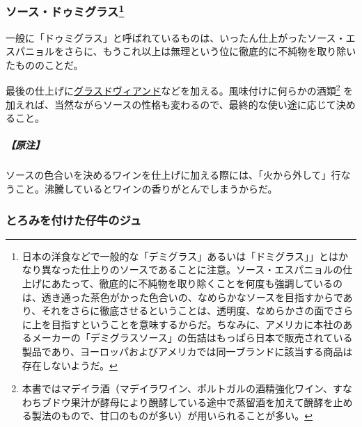 \begin{recette}
\hypertarget{sauce-demi-glace}{%
\subsubsection[ソース・ドゥミグラス]{\texorpdfstring{ソース・ドゥミグラス\footnote{日本の洋食などで一般的な「デミグラス」あるいは「ドミグラス」」とはかなり異なった仕上りのソースであることに注意。ソース・エスパニョルの仕上げにあたって、徹底的に不純物を取り除くことを何度も強調しているのは、透き通った茶色がかった色合いの、なめらかなソースを目指すからであり、それをさらに徹底させるということは、透明度、なめらかさの面でさらに上を目指すということを意味するからだ。ちなみに、アメリカに本社のあるメーカーの「デミグラスソース」の缶詰はもっぱら日本で販売されている製品であり、ヨーロッパおよびアメリカでは同一ブランドに該当する商品は存在しないようだ。}}{ソース・ドゥミグラス}}\label{sauce-demi-glace}}



一般に「ドゥミグラス」と呼ばれているものは、いったん仕上がったソース・エスパニョルをさらに、もうこれ以上は無理という位に徹底的に不純物を取り除いたもののことだ。

最後の仕上げに\protect\hyperlink{glace-de-viande}{グラスドヴィアンド}などを加える。風味付けに何らかの酒類\footnote{本書ではマデイラ酒（マデイラワイン、ポルトガルの酒精強化ワイン、すなわちブドウ果汁が酵母により醗酵している途中で蒸留酒を加えて醗酵を止める製法のもので、甘口のものが多い）が用いられることが多い。}
を加えれば、当然ながらソースの性格も変わるので、最終的な使い途に応じて決めること。

\hypertarget{nota-sauce-demi-glace}{%
\subparagraph{【原注】}\label{nota-sauce-demi-glace}}

ソースの色合いを決めるワインを仕上げに加える際には、「火から外して」行なうこと。沸騰しているとワインの香りがとんでしまうからだ。

\hypertarget{jus-de-veau-lie}{%
\subsubsection{とろみを付けた仔牛のジュ}\label{jus-de-veau-lie}}



\end{recette}
